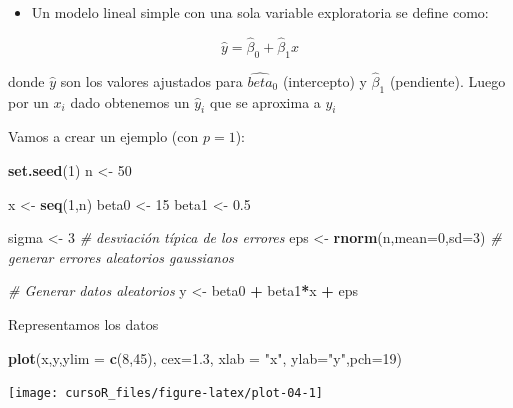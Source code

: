 \documentclass[]{book}
\newenvironment{Shaded}{\begin{snugshade}}{\end{snugshade}}
\newcommand{\KeywordTok}[1]{\textcolor[rgb]{0.13,0.29,0.53}{\textbf{#1}}}
\newcommand{\DataTypeTok}[1]{\textcolor[rgb]{0.13,0.29,0.53}{#1}}
\newcommand{\DecValTok}[1]{\textcolor[rgb]{0.00,0.00,0.81}{#1}}
\newcommand{\FloatTok}[1]{\textcolor[rgb]{0.00,0.00,0.81}{#1}}
\newcommand{\StringTok}[1]{\textcolor[rgb]{0.31,0.60,0.02}{#1}}
\newcommand{\CommentTok}[1]{\textcolor[rgb]{0.56,0.35,0.01}{\textit{#1}}}
\newcommand{\OperatorTok}[1]{\textcolor[rgb]{0.81,0.36,0.00}{\textbf{#1}}}
\newcommand{\NormalTok}[1]{#1}
\providecommand{\tightlist}{%
  \setlength{\itemsep}{0pt}\setlength{\parskip}{0pt}}
\begin{document}
\begin{itemize}
\tightlist
\item
  Un modelo lineal simple con una sola variable exploratoria se define
  como:
\end{itemize}

\[
         \hat{y} = \hat{\beta}_0 + \hat{\beta}_1 x
\]

donde \(\hat y\) son los valores ajustados para \(\hat{beta}_0\)
(intercepto) y \(\hat{\beta}_1\) (pendiente). Luego por un \(x_i\) dado
obtenemos un \(\hat{y}_i\) que se aproxima a \(y_i\)

Vamos a crear un ejemplo (con \(p=1\)):

\begin{Shaded}
\begin{Highlighting}[]
\KeywordTok{set.seed}\NormalTok{(}\DecValTok{1}\NormalTok{)}
\NormalTok{n <-}\StringTok{ }\DecValTok{50} 

\NormalTok{x <-}\StringTok{ }\KeywordTok{seq}\NormalTok{(}\DecValTok{1}\NormalTok{,n)}
\NormalTok{ beta0 <-}\StringTok{ }\DecValTok{15}
\NormalTok{ beta1 <-}\StringTok{ }\FloatTok{0.5}

\NormalTok{sigma <-}\StringTok{ }\DecValTok{3} \CommentTok{# desviación típica de los errores}
\NormalTok{eps <-}\StringTok{ }\KeywordTok{rnorm}\NormalTok{(n,}\DataTypeTok{mean=}\DecValTok{0}\NormalTok{,}\DataTypeTok{sd=}\DecValTok{3}\NormalTok{) }\CommentTok{# generar errores aleatorios gaussianos}

\CommentTok{# Generar datos aleatorios}
\NormalTok{ y <-}\StringTok{ }\NormalTok{beta0 }\OperatorTok{+}\StringTok{ }\NormalTok{beta1}\OperatorTok{*}\NormalTok{x  }\OperatorTok{+}\StringTok{  }\NormalTok{eps}
\end{Highlighting}
\end{Shaded}

Representamos los datos

\begin{Shaded}
\begin{Highlighting}[]
\KeywordTok{plot}\NormalTok{(x,y,}\DataTypeTok{ylim =} \KeywordTok{c}\NormalTok{(}\DecValTok{8}\NormalTok{,}\DecValTok{45}\NormalTok{), }\DataTypeTok{cex=}\FloatTok{1.3}\NormalTok{, }\DataTypeTok{xlab =} \StringTok{"x"}\NormalTok{, }\DataTypeTok{ylab=}\StringTok{"y"}\NormalTok{,}\DataTypeTok{pch=}\DecValTok{19}\NormalTok{)}
\end{Highlighting}
\end{Shaded}

\begin{center}\texttt{[image: cursoR\_files/figure-latex/plot-04-1]} \end{center}
\end{document}
